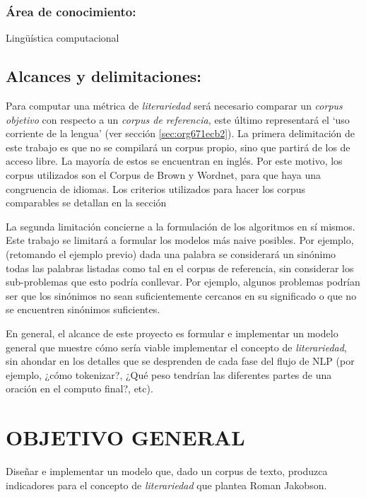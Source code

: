 \documentclass[12pt,letterpaper,twoside]{article}
\begin{document}
\subsubsection{\textbf{Área de conocimiento:}}
\label{sec:org420bc90}

Lingüística computacional

\subsection{Alcances y delimitaciones:}
\label{sec:org681b18b}

Para computar una métrica de \emph{literariedad} será necesario comparar un
\emph{corpus objetivo} con respecto a un \emph{corpus de referencia,} este
último representará el ‘uso corriente de la lengua' (ver sección
\ref{sec:org671ecb2}). La primera delimitación de este trabajo es que no se
compilará un corpus propio, sino que partirá de los de acceso
libre. La mayoría de estos se encuentran en inglés. Por este motivo,
los corpus utilizados son el Corpus de Brown y Wordnet, para
que haya una congruencia de idiomas. Los criterios
utilizados para hacer los corpus comparables se detallan en la sección

La segunda limitación concierne a la formulación de los algoritmos en
sí mismos. Este trabajo se limitará a formular los modelos más naive
posibles. Por ejemplo, (retomando el ejemplo previo) dada una palabra
se considerará un sinónimo todas las palabras listadas como tal en el
corpus de referencia, sin considerar los sub-problemas que esto podría
conllevar. Por ejemplo, algunos problemas podrían ser que los sinónimos
no sean suficientemente cercanos en su significado o que no se encuentren
sinónimos suficientes.

En general, el alcance de este proyecto es formular e implementar un
modelo general que muestre cómo sería viable implementar el concepto de
\emph{literariedad}, sin ahondar en los detalles que se desprenden de cada
fase del flujo de NLP (por ejemplo, ¿cómo tokenizar?, ¿Qué peso tendrían
las diferentes partes de una oración en el computo final?, etc).

\section{OBJETIVO GENERAL}
\label{sec:org803df7e}
Diseñar e implementar un modelo que, dado un corpus de texto, produzca
indicadores para el concepto de \emph{literariedad} que plantea Roman Jakobson.
\end{document}
